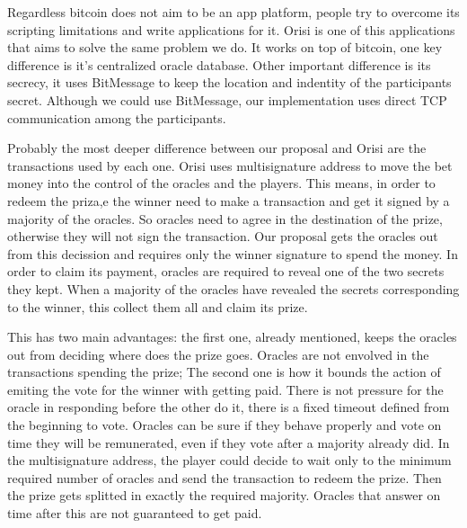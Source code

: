 Regardless bitcoin does not aim to be an app platform, people try to overcome
  its scripting limitations and write applications for it.
Orisi is one of this applications that aims to solve the same problem we do.
It works on top of bitcoin, one key difference is it's centralized oracle
  database.
Other important difference is its secrecy, it uses BitMessage to keep the
  location and indentity of the participants secret.
Although we could use BitMessage, our implementation uses direct TCP
  communication among the participants.

Probably the most deeper difference between our proposal and Orisi are the
  transactions used by each one.
Orisi uses multisignature address to move the bet money into the control of
  the oracles and the players.
This means, in order to redeem the priza,e the winner need to make a transaction
  and get it signed by a majority of the oracles.
So oracles need to agree in the destination of the prize, otherwise they will
  not sign the transaction.
Our proposal gets the oracles out from this decission and requires only the
  winner signature to spend the money.
In order to claim its payment, oracles are required to reveal one of the two
  secrets they kept.
When a majority of the oracles have revealed the secrets corresponding to the
  winner, this collect them all and claim its prize.

This has two main advantages: the first one, already mentioned, keeps the
  oracles out from deciding where does the prize goes.
Oracles are not envolved in the transactions spending the prize;
The second one is how it bounds the action of emiting the vote for the winner
  with getting paid.
There is not pressure for the oracle in responding before the other do it,
  there is a fixed timeout defined from the beginning to vote.
Oracles can be sure if they behave properly and vote on time they will be
  remunerated, even if they vote after a majority already did.
In the multisignature address, the player could decide to wait only to the
  minimum required number of oracles and send the transaction to redeem the
  prize.
Then the prize gets splitted in exactly the required majority.
Oracles that answer on time after this are not guaranteed to get paid.
